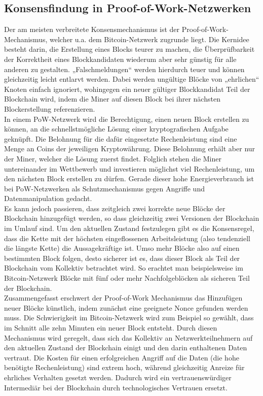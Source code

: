 \documentclass[12pt]{article}
\begin{document}
\subsection{Konsensfindung in Proof-of-Work-Netzwerken}
Der am meisten verbreitete Konsensmechanismus ist der Proof-of-Work-Mechanismus, welcher u.a. dem Bitcoin-Netzwerk zugrunde liegt. Die Kernidee besteht darin, die Erstellung eines Blocks teurer zu machen, die Überprüfbarkeit der Korrektheit eines Blockkandidaten wiederum aber sehr günstig für alle anderen zu gestalten. „Falschmeldungen“ werden hierdurch teuer und können gleichzeitig leicht entlarvt werden. Dabei werden ungültige Blöcke von „ehrlichen“ Knoten einfach ignoriert, wohingegen ein neuer gültiger Blockkandidat Teil der Blockchain wird, indem die Miner auf diesen Block bei ihrer nächsten Blockerstellung referenzieren.\\
In einem PoW-Netzwerk wird die Berechtigung, einen neuen Block erstellen zu können, an die schnellstmögliche Lösung einer kryptografischen Aufgabe geknüpft. Die Belohnung für die dafür eingesetzte Rechenleistung sind eine Menge an Coins der jeweiligen Kryptowährung. Diese Belohnung erhält aber nur der Miner, welcher die Lösung zuerst findet. Folglich stehen die Miner untereinander im Wettbewerb und investieren möglichst viel Rechenleistung, um den nächsten Block erstellen zu dürfen.  Gerade dieser hohe Energieverbrauch ist bei PoW-Netzwerken als Schutzmechanismus gegen Angriffe und Datenmanipulation gedacht.\\
Es kann jedoch passieren, dass zeitgleich zwei korrekte neue Blöcke der Blockchain hinzugefügt werden, so dass gleichzeitig zwei Versionen der Blockchain im Umlauf sind. Um den aktuellen Zustand festzulegen gibt es die Konsensregel, dass die Kette mit der höchsten eingeflossenen Arbeitsleistung (also tendenziell die längste Kette) die Aussagekräftige ist. Umso mehr Blöcke also auf einen bestimmten Block folgen, desto sicherer ist es, dass dieser Block als Teil der Blockchain vom Kollektiv betrachtet wird. So erachtet man beispielsweise im Bitcoin-Netzwerk Blöcke mit fünf oder mehr Nachfolgeblöcken als sicheren Teil der Blockchain.\\
Zusammengefasst erschwert der Proof-of-Work Mechanismus das Hinzufügen neuer Blöcke künstlich, indem zunächst eine geeignete Nonce gefunden werden muss. Die Schwierigkeit im Bitcoin-Netzwerk wird zum Beispiel so gewählt, dass im Schnitt alle zehn Minuten ein neuer Block entsteht. Durch diesen Mechanismus wird geregelt, dass sich das Kollektiv an Netzwerkteilnehmern auf den aktuellen Zustand der Blockchain einigt und den darin enthaltenen Daten vertraut. Die Kosten für einen erfolgreichen Angriff auf die Daten (die hohe benötigte Rechenleistung) sind extrem hoch, während gleichzeitig Anreize für ehrliches Verhalten gesetzt werden. Dadurch wird ein vertrauenswürdiger Intermediär bei der Blockchain durch technologisches Vertrauen ersetzt.
\end{document}
